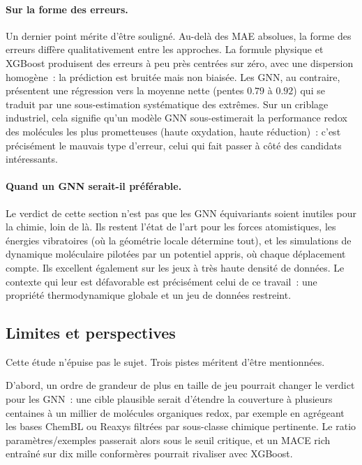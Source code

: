 \paragraph{Sur la forme des erreurs.}
Un dernier point mérite d'être souligné. Au-delà des MAE absolues, la forme des erreurs diffère qualitativement entre les approches. La formule physique et XGBoost produisent des erreurs à peu près centrées sur zéro, avec une dispersion homogène~: la prédiction est bruitée mais non biaisée. Les GNN, au contraire, présentent une régression vers la moyenne nette (pentes $0.79$ à $0.92$) qui se traduit par une sous-estimation systématique des extrêmes. Sur un criblage industriel, cela signifie qu'un modèle GNN sous-estimerait la performance redox des molécules les plus prometteuses (haute oxydation, haute réduction)~: c'est précisément le mauvais type d'erreur, celui qui fait passer à côté des candidats intéressants.

\paragraph{Quand un GNN serait-il préférable.}
Le verdict de cette section n'est pas que les GNN équivariants soient inutiles pour la chimie, loin de là. Ils restent l'état de l'art pour les forces atomistiques, les énergies vibratoires (où la géométrie locale détermine tout), et les simulations de dynamique moléculaire pilotées par un potentiel appris, où chaque déplacement compte. Ils excellent également sur les jeux à très haute densité de données. Le contexte qui leur est défavorable est précisément celui de ce travail~: une propriété thermodynamique globale et un jeu de données restreint.

\subsection{Limites et perspectives}
\label{sec:ml_perspectives}

Cette étude n'épuise pas le sujet. Trois pistes méritent d'être mentionnées.

D'abord, un ordre de grandeur de plus en taille de jeu pourrait changer le verdict pour les GNN~: une cible plausible serait d'étendre la couverture à plusieurs centaines à un millier de molécules organiques redox, par exemple en agrégeant les bases ChemBL ou Reaxys filtrées par sous-classe chimique pertinente. Le ratio paramètres/exemples passerait alors sous le seuil critique, et un MACE rich entraîné sur dix mille conformères pourrait rivaliser avec XGBoost.

